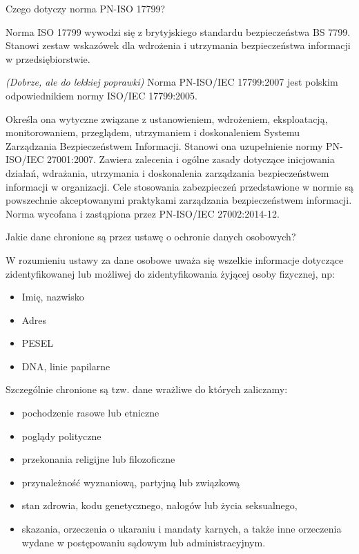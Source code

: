 \documentclass[answers,11pt]{exam}
\newcommand{\fixit}{\textit{(Dobrze, ale do lekkiej poprawki)} }
\begin{document}
\begin{questions}
\question Czego dotyczy norma PN-ISO 17799?
\begin{solution}
Norma ISO 17799 wywodzi się z brytyjskiego standardu bezpieczeństwa BS 7799. Stanowi zestaw wskazówek dla wdrożenia i utrzymania bezpieczeństwa informacji w przedsiębiorstwie.

\fixit
Norma PN-ISO/IEC 17799:2007 jest polskim odpowiednikiem normy ISO/IEC 17799:2005.

Określa ona wytyczne związane z ustanowieniem, wdrożeniem, eksploatacją, monitorowaniem, przeglądem, utrzymaniem i doskonaleniem Systemu Zarządzania Bezpieczeństwem Informacji. Stanowi ona uzupełnienie normy PN-ISO/IEC 27001:2007. Zawiera zalecenia i ogólne zasady dotyczące inicjowania działań, wdrażania, utrzymania i doskonalenia zarządzania bezpieczeństwem informacji w organizacji. Cele stosowania zabezpieczeń przedstawione w normie są powszechnie akceptowanymi praktykami zarządzania bezpieczeństwem informacji. Norma wycofana i zastąpiona przez PN-ISO/IEC 27002:2014-12.

\end{solution}

\question Jakie dane chronione są przez ustawę o ochronie danych osobowych?
\begin{solution}
W rozumieniu ustawy za dane osobowe uważa się wszelkie informacje dotyczące zidentyfikowanej lub możliwej do zidentyfikowania żyjącej osoby fizycznej, np:
\begin{itemize}
\item Imię, nazwisko
\item Adres
\item PESEL
\item DNA, linie papilarne
\end{itemize}

Szczególnie chronione są tzw. dane wrażliwe do których zaliczamy:
\begin{itemize}
\item pochodzenie rasowe lub etniczne
\item poglądy polityczne
\item przekonania religijne lub filozoficzne
\item przynależność wyznaniową, partyjną lub związkową
\item stan zdrowia, kodu genetycznego, nałogów lub życia seksualnego,
\item skazania, orzeczenia o ukaraniu i mandaty karnych, a także inne orzeczenia wydane w postępowaniu sądowym lub administracyjnym.
\end{itemize}


\end{solution}
\end{questions}
\end{document}
